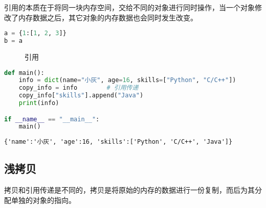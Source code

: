 引用的本质在于将同一块内存空间，交给不同的对象进行同时操作，当一个对象修改了内存数据之后，其它对象的内存数据也会同时发生改变。

\vspace{-0.5cm}

\begin{lstlisting}[language=Python]
a = {1:[1, 2, 3]}
b = a
\end{lstlisting}

\begin{figure}[H]
	\centering
	\caption{引用}
\end{figure}

\vspace{0.5cm}


\begin{lstlisting}[language=Python]
def main():
    info = dict(name="小灰", age=16, skills=["Python", "C/C++"])
    copy_info = info        # 引用传递
    copy_info["skills"].append("Java")
    print(info)

if __name__ == "__main__":
    main()
\end{lstlisting}

\begin{tcolorbox}
	\begin{verbatim}
{'name':'小灰', 'age':16, 'skills':['Python', 'C/C++', 'Java']}
\end{verbatim}
\end{tcolorbox}

\vspace{0.5cm}

\subsection{浅拷贝}

拷贝和引用传递是不同的，拷贝是将原始的内存的数据进行一份复制，而后为其分配单独的对象的指向。

\vspace{-0.5cm}

